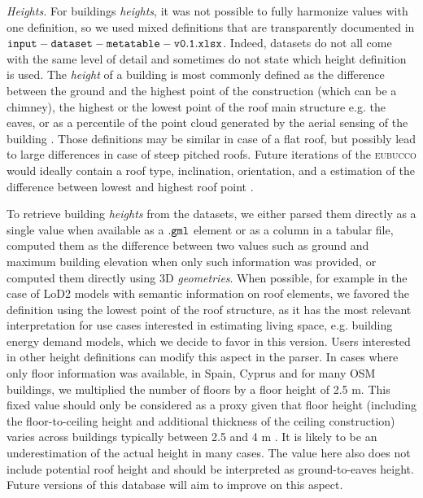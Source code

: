 \documentclass[fleqn,10pt]{wlscirep}
\begin{document}
\medskip \noindent \textit{Heights.} \hspace{0.1cm} For buildings \textit{heights}, it was not possible to fully harmonize values with one definition, so we used mixed definitions that are transparently documented in ${\tt input-dataset-metatable-v0.1.xlsx}$. Indeed, datasets do not all come with the same level of detail and sometimes do not state which height definition is used. The \textit{height} of a building is most commonly defined as the difference between the ground and the highest point of the construction (which can be a chimney), the highest or the lowest point of the roof main structure e.g. the eaves, or as a percentile of the point cloud generated by the aerial sensing of the building \cite{peters2021automated}. Those definitions may be similar in case of a flat roof, but possibly lead to large differences in case of steep pitched roofs. Future iterations of the \textsc{eubucco} would ideally contain a roof type, inclination, orientation, and a estimation of the difference between lowest and highest roof point \cite{zhang2022vectorized}.    

To retrieve building \textit{heights} from the datasets, we either parsed them directly as a single value when available as a $\tt{.gml}$ element or as a column in a tabular file, computed them as the difference between two values such as ground and maximum building elevation when only such information was provided, or computed them directly using 3D \textit{geometries}. When possible, for example in the case of LoD2 models with semantic information on roof elements, we favored the definition using the lowest point of the roof structure, as it has the most relevant interpretation for use cases interested in estimating living space, e.g. building energy demand models, which we decide to favor in this version. Users interested in other height definitions can modify this aspect in the parser. In cases where only floor information was available, in Spain, Cyprus and for many OSM buildings, we multiplied the number of floors by a floor height of 2.5 m. This fixed value should only be considered as a proxy given that floor height (including the floor-to-ceiling height and additional thickness of the ceiling construction) varies across buildings typically between 2.5 and 4 m \cite{biljecki2017generating,usui2022comparison}. It is likely to be an underestimation of the actual height in many cases. The value here also does not include potential roof height and should be interpreted as ground-to-eaves height. Future versions of this database will aim to improve on this aspect.
\end{document}
